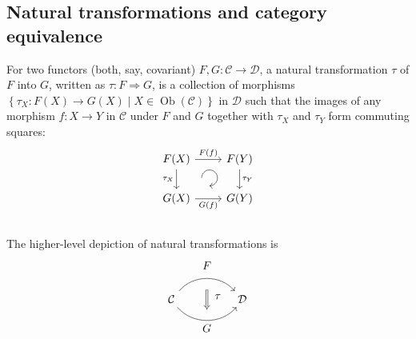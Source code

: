 \documentclass[english,letterpaper]{article}%
\numberwithin{equation}{section}
\numberwithin{figure}{section}
\numberwithin{table}{section}
\theoremstyle{definition}
\theoremstyle{definition}
\theoremstyle{definition}
\theoremstyle{plain}
\theoremstyle{plain}
\theoremstyle{plain}
\theoremstyle{plain}
\theoremstyle{remark}
\theoremstyle{remark}
\DeclareMathOperator{\ob}{Ob}
\begin{document}
\subsection{Natural transformations and category equivalence}
\begin{defn}
For two functors (both, say, covariant) $F,G:\mathcal{C}\to\mathcal{D}$,
a natural transformation $\tau$ of $F$ into $G$, written as $\tau:F\Longrightarrow G$,
is a collection of morphisms $\left\{ \tau_{X}:F\left(X\right)\to G\left(X\right)\mid X\in\ob\left(\mathcal{C}\right)\right\} $
in $\mathcal{D}$ such that the images of any morphism $f:X\to Y$
in $\mathcal{C}$ under $F$ and $G$ together with $\tau_{X}$ and
$\tau_{Y}$ form commuting squares:\[\begin{tikzcd}[every matrix/.append style={name=m},   
execute at end picture={\draw [<-] ([xshift=-2.7em,yshift=1mm]m-2-2.north) arc[start angle=-90,delta angle=270,radius=0.25cm];}]
   F(X) \arrow[r,"F(f)"]\arrow[d,swap,"\tau_X"]& F(Y)\arrow[d,"\tau_Y"] \\
   G(X)\arrow[r,swap,"G(f)"]& G(Y)\\
\end{tikzcd}\]The higher-level depiction of natural transformations is \[\begin{tikzcd}[column sep=huge]
\mathcal{C}   \arrow[bend left=50]{r}[name=U,label=above:$F$]{}   \arrow[bend right=50]{r}[name=D,label=below:$G$]{} & \mathcal D   \arrow[shorten <=10pt,shorten >=5pt,Rightarrow,to path={(U) -- node[label=right:$\tau$] {} (D)}]{} 
\end{tikzcd}\]
\end{defn}
\end{document}
